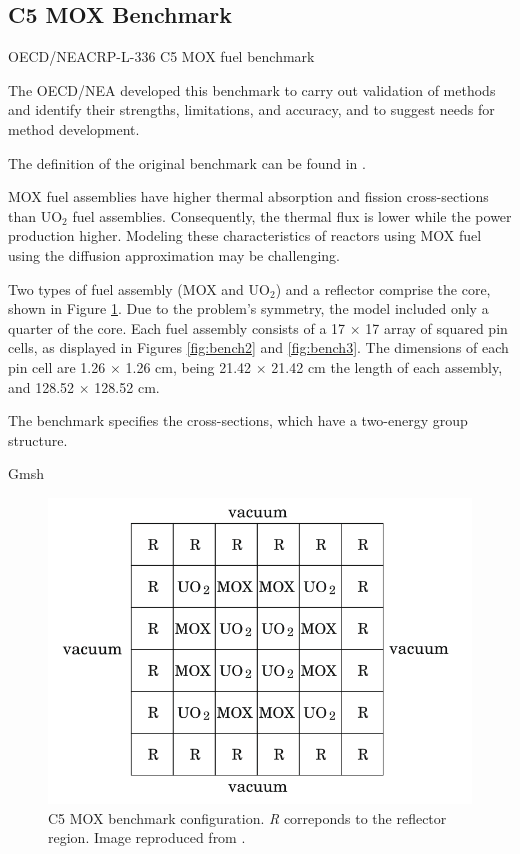 \documentclass{anstrans}
\begin{document}
\subsection{C5 MOX Benchmark}

OECD/NEACRP-L-336 C5 MOX fuel benchmark \cite{cavarec_benchmark_1994}

The \gls{OECD}/\gls{NEA} developed this benchmark to carry out validation of methods and identify their strengths, limitations, and accuracy, and to suggest needs for method development.

The definition of the original benchmark can be found in .

MOX fuel assemblies have higher thermal absorption and fission cross-sections than UO$_2$ fuel assemblies.
Consequently, the thermal flux is lower while the power production higher.
Modeling these characteristics of reactors using MOX fuel using the diffusion approximation may be challenging.

Two types of fuel assembly (MOX and UO$_2$) and a reflector comprise the core, shown in Figure \ref{fig:bench1}.
Due to the problem's symmetry, the model included only a quarter of the core.
Each fuel assembly consists of a 17 $\times$ 17 array of squared pin cells, as displayed in Figures \ref{fig:bench2} and \ref{fig:bench3}.
The dimensions of each pin cell are 1.26 $\times$ 1.26 cm, being 21.42 $\times$ 21.42 cm the length of each assembly, and 128.52 $\times$ 128.52 cm.

The benchmark \cite{cavarec_benchmark_1994} specifies the cross-sections, which have a two-energy group structure.

Gmsh

\begin{figure}[htbp!] %
    \centering
    \includegraphics[width=0.95\linewidth]{figures/bench-config.png}
    \hfill
    \caption{C5 MOX benchmark configuration. \textit{R} correponds to the reflector region. Image reproduced from \cite{capilla_applications_2009}.}
    \label{fig:bench1}
\end{figure}
\end{document}
